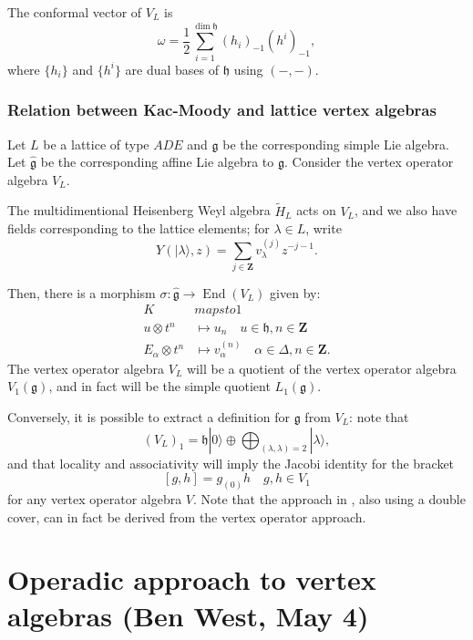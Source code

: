 \documentclass{article}
\newcommand{\ZZ}{\mathbold{Z}}
\newcommand{\vac}{|0\rangle}
\newcommand{\gf}{\mathfrak{g}}
\newcommand{\hh}{\mathfrak{h}}
\newcommand{\ghat}{\widehat{\mathfrak{g}}}
\DeclareMathOperator{\End}{End}
\begin{document}
The conformal vector of $V_L$ is
\[\omega=\frac{1}{2} \sum_{i=1}^{\dim \hh}(h_i)_{-1}(h^i)_{-1}, \]
where $\{h_i\}$ and $\{h^i\}$ are dual bases of $\hh$ using $(-,-)$.
\subsubsection{Relation between Kac-Moody and lattice vertex algebras}
Let $L$ be a lattice of type $ADE$ and $\gf$ be the corresponding simple Lie algebra.  Let $\ghat$ be the corresponding affine Lie algebra to $\gf$.  Consider the vertex operator algebra $V_L$.

The multidimentional Heisenberg Weyl algebra $\widetilde{H}_L$ acts on $V_L$, and we also have fields corresponding to the lattice elements; for $\lambda \in L$, write
\[Y(|\lambda\rangle,z)=\sum_{j \in \ZZ}v^{(j)}_\lambda z^{-j-1}. \]

Then, there is a morphism $\sigma: \ghat \rightarrow \End(V_L)$ given by:
\begin{align}
  K &mapsto 1\\
  u \otimes t^n &\mapsto u_n \quad u \in \hh, n \in \ZZ\\
  E_\alpha \otimes t^n &\mapsto v^{(n)}_\alpha \quad \alpha \in \Delta, n \in \ZZ.
\end{align}
The vertex operator algebra $V_L$ will be a quotient of the vertex operator algebra $V_1(\gf)$, and in fact will be the simple quotient $L_1(\gf)$.

Conversely, it is possible to extract a definition for $\gf$ from $V_L$: note that
\[(V_L)_1 = \hh \vac \oplus \bigoplus_{(\lambda,\lambda)=2}|\lambda\rangle, \]
and that locality and associativity will imply the Jacobi identity for the bracket
\[[g,h]=g_{(0)}h \quad g,h \in V_1 \]
for any vertex operator algebra $V$.  Note that the approach in \cite{MR1854697}, also using a double cover, can in fact be derived from the vertex operator approach.
\section{Operadic approach to vertex algebras (Ben West, May 4)}
\end{document}
